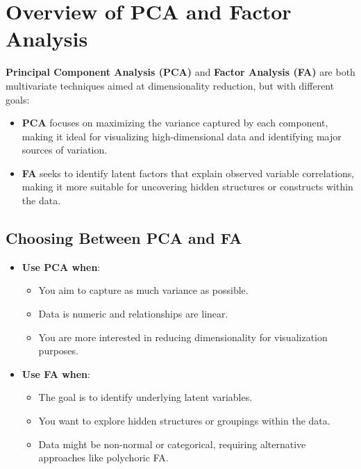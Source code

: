 \section{Overview of PCA and Factor Analysis}
\textbf{Principal Component Analysis (PCA)} and \textbf{Factor Analysis (FA)} are both multivariate techniques aimed at dimensionality reduction, but with different goals:
\begin{itemize}
    \item \textbf{PCA} focuses on maximizing the variance captured by each component, making it ideal for visualizing high-dimensional data and identifying major sources of variation.
    \item \textbf{FA} seeks to identify latent factors that explain observed variable correlations, making it more suitable for uncovering hidden structures or constructs within the data.
\end{itemize}

\subsection{Choosing Between PCA and FA}
\begin{itemize}
    \item \textbf{Use PCA when}:
        \begin{itemize}
            \item You aim to capture as much variance as possible.
            \item Data is numeric and relationships are linear.
            \item You are more interested in reducing dimensionality for visualization purposes.
        \end{itemize}
    \item \textbf{Use FA when}:
        \begin{itemize}
            \item The goal is to identify underlying latent variables.
            \item You want to explore hidden structures or groupings within the data.
            \item Data might be non-normal or categorical, requiring alternative approaches like polychoric FA.
        \end{itemize}
\end{itemize}

